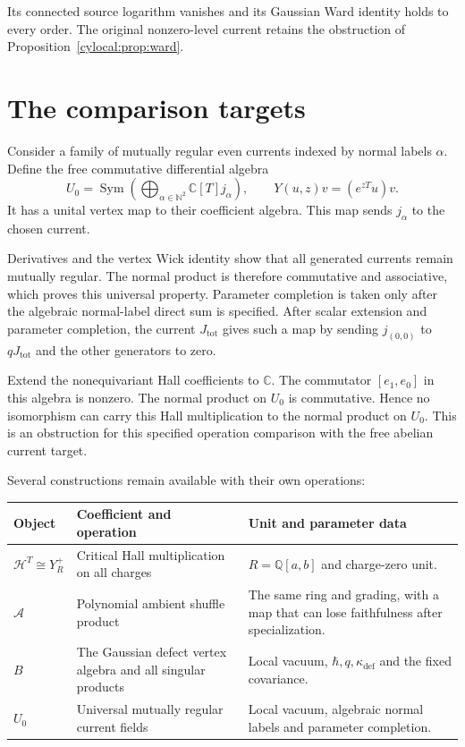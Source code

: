 Its connected source logarithm vanishes and its Gaussian Ward
identity holds to every order. The original nonzero-level current
retains the obstruction of Proposition~\ref{cylocal:prop:ward}.

\section{The comparison targets}
\label{cylocal:sec:targets}

Consider a family of mutually regular even currents indexed by normal
labels $\alpha$. Define the free commutative differential algebra
\[
 U_0=\operatorname{Sym}
       \left(\bigoplus_{\alpha\in\mathbb N^2}\mathbb C[T]j_\alpha\right),
 \qquad Y(u,z)v=(e^{zT}u)v.
\]
It has a unital vertex map to their coefficient algebra.
This map sends $j_\alpha$ to the chosen current.

Derivatives and the vertex Wick
identity show that all generated currents remain mutually regular.
The normal product is therefore commutative and associative, which
proves this universal property. Parameter completion is taken only
after the algebraic normal-label direct sum is specified.
After scalar extension and parameter completion, the current
$J_{\mathrm{tot}}$ gives such a map by sending
$j_{(0,0)}$ to $qJ_{\mathrm{tot}}$ and the other generators to zero.

Extend the nonequivariant Hall coefficients to $\mathbb C$.
The commutator $[e_1,e_0]$ in this algebra is nonzero.
The normal product on $U_0$ is commutative. Hence no isomorphism
can carry this Hall multiplication to the normal product on $U_0$. This is an obstruction for this specified operation
comparison with the free abelian current target.

Several constructions remain available with their own operations:
\begin{center}
\small
\begin{tabularx}{\textwidth}{@{}lXX@{}}
\toprule
Object&Coefficient and operation&Unit and parameter data\\
\midrule
$\mathcal H^T\cong Y_R^+$
 &Critical Hall multiplication on all charges
 &$R=\mathbb Q[a,b]$ and charge-zero unit.\\
$\mathcal A$
 &Polynomial ambient shuffle product
 &The same ring and grading, with a map that can lose faithfulness
 after specialization.\\
$B$
 &The Gaussian defect vertex algebra and all singular products
 &Local vacuum, $\hbar,q,\kappa_{\mathrm{def}}$ and the fixed covariance.\\
$U_0$
 &Universal mutually regular current fields
 &Local vacuum, algebraic normal labels and parameter completion.\\
\bottomrule
\end{tabularx}
\end{center}

